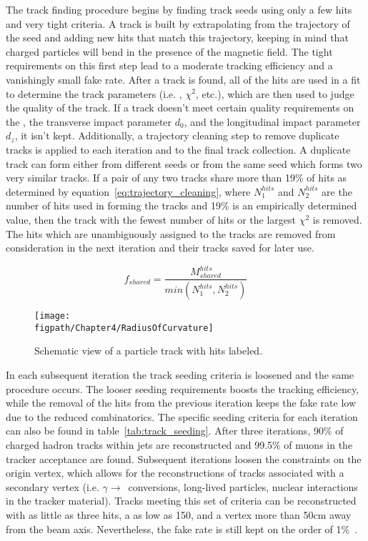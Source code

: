 The track finding procedure begins by finding track seeds using only a few hits and very tight criteria.
A track is built by extrapolating from the trajectory of the seed and adding new hits that match this trajectory, keeping in mind that charged particles will bend in the presence of the magnetic field.
The tight requirements on this first step lead to a moderate tracking efficiency and a vanishingly small fake rate.
After a track is found, all of the hits are used in a fit to determine the track parameters (i.e. \pt, $\chi^{2}$, etc.), which are then used to judge the quality of the track.
If a track doesn't meet certain quality requirements on the \pt, the transverse impact parameter $d_{0}$, and the longitudinal impact parameter $d_{z}$, it isn't kept.
Additionally, a trajectory cleaning step to remove duplicate tracks is applied to each iteration and to the final track collection.
A duplicate track can form either from different seeds or from the same seed which forms two very similar tracks.
If a pair of any two tracks share more than 19\% of hits as determined by equation~\ref{eq:trajectory_cleaning}, where $N^{hits}_{1}$ and $N^{hits}_{2}$ are the number of hits used in forming the tracks and 19\% is an empirically determined value, then the track with the fewest number of hits or the largest $\chi^{2}$ is removed.
The hits which are unambiguously assigned to the tracks are removed from consideration in the next iteration and their tracks saved for later use.

\begin{equation}
\label{eq:trajectory_cleaning}
f_{shared}=\frac{M^{hits}_{shared}}{min\left(N^{hits}_{1},N^{hits}_{2}\right)}
\end{equation}

\begin{figure}[!hbt]
    \centering
    \texttt{[image: \\figpath/Chapter4/RadiusOfCurvature]}
    \caption{Schematic view of a particle track with hits labeled.}
    \label{fig:radius_of_curvature}
\end{figure}

In each subsequent iteration the track seeding criteria is loosened and the same procedure occurs.
The looser seeding requirements boosts the tracking efficiency, while the removal of the hits from the previous iteration keeps the fake rate low due to the reduced combinatorics.
The specific seeding criteria for each iteration can also be found in table~\ref{tab:track_seeding}.
After three iterations, 90\% of charged hadron tracks within jets are reconstructed and 99.5\% of muons in the tracker acceptance are found.
Subsequent iterations loosen the constraints on the origin vertex, which allows for the reconstructions of tracks associated with a secondary vertex (i.e. $\gamma\rightarrow$\Pep\Pem~conversions, long-lived particles, nuclear interactions in the tracker material).
Tracks meeting this set of criteria can be reconstructed with as little as three hits, a \pt as low as 150\mev, and a vertex  more than 50\unit{cm} away from the beam axis.
Nevertheless, the fake rate is still kept on the order of 1\%~\cite{CMS-PAS-PFT-09-001}.

